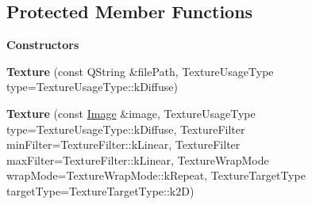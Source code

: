 \subsection*{Protected Member Functions}
\begin{Indent}\textbf{ Constructors}\par
\begin{DoxyCompactItemize}
\item 
\mbox{\label{classrev_1_1_texture_a907def25ec00edb9d3fb0fc60bec6235}} 
{\bfseries Texture} (const Q\+String \&file\+Path, Texture\+Usage\+Type type=Texture\+Usage\+Type\+::k\+Diffuse)
\item 
\mbox{\label{classrev_1_1_texture_a3af577797f2b901ab130756637001b7f}} 
{\bfseries Texture} (const \mbox{\hyperlink{classrev_1_1_image}{Image}} \&image, Texture\+Usage\+Type type=Texture\+Usage\+Type\+::k\+Diffuse, Texture\+Filter min\+Filter=Texture\+Filter\+::k\+Linear, Texture\+Filter max\+Filter=Texture\+Filter\+::k\+Linear, Texture\+Wrap\+Mode wrap\+Mode=Texture\+Wrap\+Mode\+::k\+Repeat, Texture\+Target\+Type target\+Type=Texture\+Target\+Type\+::k2D)
\end{DoxyCompactItemize}
\end{Indent}
